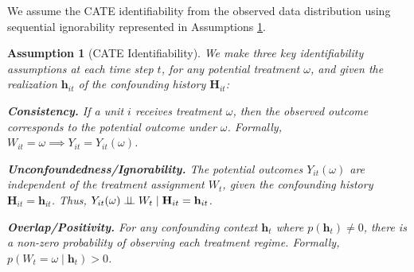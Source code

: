 \documentclass[10pt]{article} %
\newtheorem{assumption}[theorem]{Assumption}
\begin{document}
We assume the CATE identifiability from the observed data distribution using sequential ignorability \citep{robins2009estimation,lim2018RMSM, bica2020estimatingCRN} represented in Assumptions \ref{assp:cate_identif}.
\begin{assumption}[CATE Identifiability] 
We make three key identifiability assumptions at each time step $t$, for any potential treatment $\omega$, and given the realization $\mathbf{h}_{it}$ of the confounding history $\mathbf{H}_{it}$:
\begin{compactenum}
    \item \textbf{Consistency.} \label{assp:consistency} 
    If a unit $i$ receives treatment $\omega$, then the observed outcome corresponds to the potential outcome under $\omega$. Formally, $W_{it} = \omega \implies Y_{it} = Y_{it}(\omega)$.
    
    \item \textbf{Unconfoundedness/Ignorability.} \label{assp:ignorability} 
    The potential outcomes $Y_{it}(\omega)$ are independent of the treatment assignment $W_t$, given the confounding history $\mathbf{H}_{it} = \mathbf{h}_{it}$. Thus, $Y_{it}(\omega) \perp \!\!\! \perp W_t \mid \mathbf{H}_{it} = \mathbf{h}_{it}$.
    
    \item \textbf{Overlap/Positivity.} \label{assp:overlap} 
    For any confounding context $\mathbf{h}_{t}$ where $p(\mathbf{h}_t) \neq 0$, there is a non-zero probability of observing each treatment regime. Formally, $p(W_t = \omega \mid \mathbf{h}_t) > 0$.
\end{compactenum}
\label{assp:cate_identif}
\end{assumption}
\end{document}
